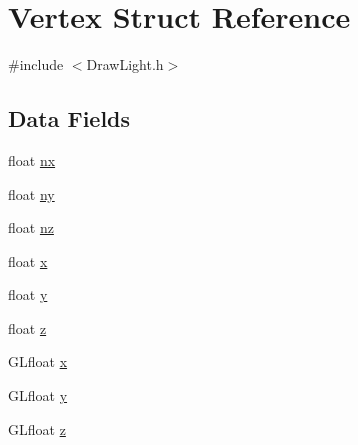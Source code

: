 \hypertarget{struct_vertex}{\section{Vertex Struct Reference}
\label{struct_vertex}
}


{\ttfamily \#include $<$Draw\-Light.\-h$>$}

\subsection*{Data Fields}
\begin{DoxyCompactItemize}
\item 
float \hyperlink{struct_vertex_a74d17801d3876700834f1b5eca4605f7}{nx}
\item 
float \hyperlink{struct_vertex_a9c79b33ae8c9c2a5388a32077d5eed37}{ny}
\item 
float \hyperlink{struct_vertex_a8c50d0e8d34556fe8e48394c315c12fd}{nz}
\item 
float \hyperlink{struct_vertex_ad0da36b2558901e21e7a30f6c227a45e}{x}
\item 
float \hyperlink{struct_vertex_aa4f0d3eebc3c443f9be81bf48561a217}{y}
\item 
float \hyperlink{struct_vertex_af73583b1e980b0aa03f9884812e9fd4d}{z}
\item 
G\-Lfloat \hyperlink{struct_vertex_a8c0375fe22dfa4d910b93f7f270c4097}{x}
\item 
G\-Lfloat \hyperlink{struct_vertex_a6a357cf500a8f13fecb5c6f8b684e5b6}{y}
\item 
G\-Lfloat \hyperlink{struct_vertex_acfde595878f838c910907ec90d040114}{z}
\end{DoxyCompactItemize}


